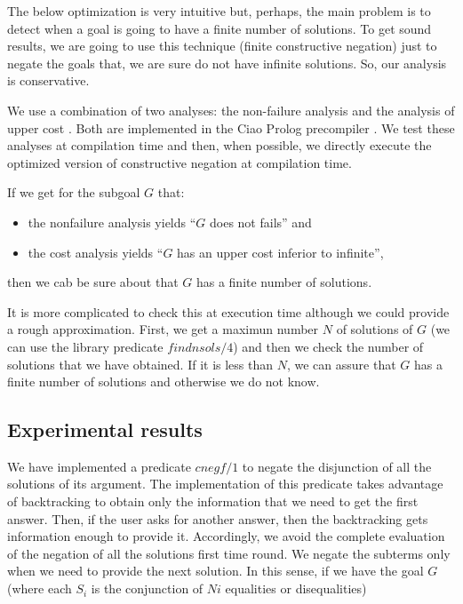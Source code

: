 \documentclass{llncs}
\begin{document}
The below optimization is very intuitive but, perhaps, the main
problem is to detect when a goal is going to have a finite number of
solutions. To get sound results, we are going to use this technique
(finite constructive negation) just to negate the goals that, we are
sure do not have infinite solutions. So, our analysis is conservative.

We use a combination of two analyses: the non-failure analysis
\cite{Lopez1} and the analysis of upper cost \cite{Lopez2}. Both are
implemented in the Ciao Prolog precompiler
\cite{ciaopp-iclp99-tut}. We test these analyses at compilation time
and then, when possible, we directly execute the optimized version
of constructive negation at compilation time.

If we get for the subgoal $G$ that:
\begin{itemize}
      \item the nonfailure analysis yields ``$G$ does not fails'' and
      \item the cost analysis yields ``$G$ has an upper cost
      inferior to infinite'',
\end{itemize}
\noindent
then we cab be sure about that $G$ has a finite number of solutions.

It is more complicated to check this at execution time although we
could provide a rough approximation. First, we get a maximun number
$N$ of solutions of $G$ (we can use the library predicate
$findnsols/4$) and then we check the number of solutions that we have
obtained. If it is less than $N$, we can assure that $G$ has a finite
number of solutions and otherwise we do not know.


\subsection{Experimental results}

We have implemented a predicate $cnegf/1$ to negate the disjunction of
all the solutions of its argument. The implementation of this
predicate takes advantage of backtracking to obtain only the
information that we need to get the first answer. Then, if the user
asks for another answer, then the backtracking gets information enough
to provide it. Accordingly, we avoid the complete evaluation of the
negation of all the solutions first time round. We negate the subterms
only when we need to provide the next solution. In this sense, if we
have the goal $G$ (where each $S_i$ is the conjunction of $Ni$
equalities or disequalities)
\end{document}
